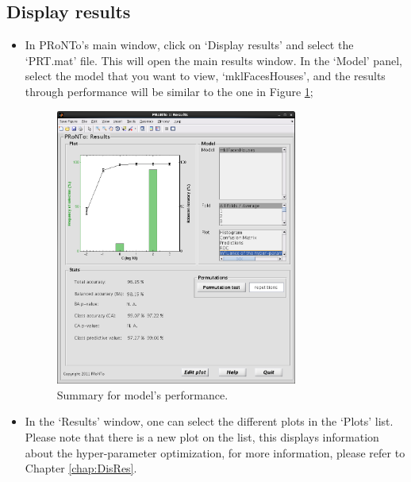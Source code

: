 
\subsection{Display results}
\label{display_results_MKL}

\begin{itemize}
	
	\item In PRoNTo's main window, click on `Display results' and select the `PRT.mat' file. This will open the main results window. In the `Model' panel, select the model that you want to view, `mklFacesHouses', and the results through performance will be similar to the one in Figure \ref{fig:resultsmkl};
	
	\begin{figure}[!h]
	\centering
		\includegraphics[width=0.75\textwidth]{images/Tutorial/mkl/resultsmkl.png}
	\caption{Summary for model's performance.}
	\label{fig:resultsmkl}
\end{figure}
	
	\item In the `Results' window, one can select the different plots in the `Plots' list. Please note that there is a new plot on the list, this displays information about the hyper-parameter optimization, for more information, please refer to Chapter \ref{chap:DisRes}.
		
	
\end{itemize}
	
